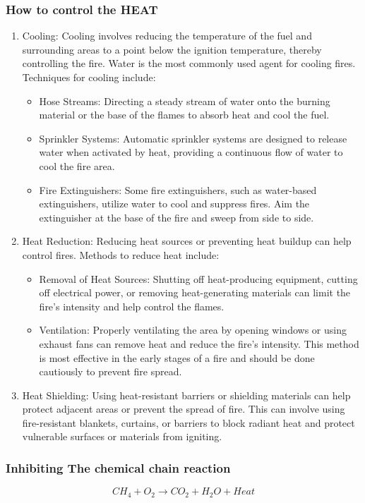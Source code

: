 \documentclass{article}
\begin{document}
\subsubsection*{How to control the HEAT}
\begin{enumerate}
  \item Cooling:
  Cooling involves reducing the temperature of the fuel and surrounding areas to a point below the ignition temperature, thereby controlling the fire. Water is the most commonly used agent for cooling fires. Techniques for cooling include:
  \begin{itemize}
    \item   Hose Streams: Directing a steady stream of water onto the burning material or the base of the flames to absorb heat and cool the fuel.
    \item Sprinkler Systems: Automatic sprinkler systems are designed to release water when activated by heat, providing a continuous flow of water to cool the fire area.
    \item Fire Extinguishers: Some fire extinguishers, such as water-based extinguishers, utilize water to cool and suppress fires. Aim the extinguisher at the base of the fire and sweep from side to side.
  \end{itemize}
    \item Heat Reduction:
    Reducing heat sources or preventing heat buildup can help control fires. Methods to reduce heat include:
    \begin{itemize}
      \item Removal of Heat Sources: Shutting off heat-producing equipment, cutting off electrical power, or removing heat-generating materials can limit the fire's intensity and help control the flames.
      \item Ventilation: Properly ventilating the area by opening windows or using exhaust fans can remove heat and reduce the fire's intensity. This method is most effective in the early stages of a fire and should be done cautiously to prevent fire spread.
    \end{itemize}    
    \item Heat Shielding:
    Using heat-resistant barriers or shielding materials can help protect adjacent areas or prevent the spread of fire. This can involve using fire-resistant blankets, curtains, or barriers to block radiant heat and protect vulnerable surfaces or materials from igniting.  
\end{enumerate}

\subsubsection*{Inhibiting The chemical chain reaction}
$$CH_4 + O_2 \rightarrow CO_2 + H_2O + Heat$$
\end{document}
